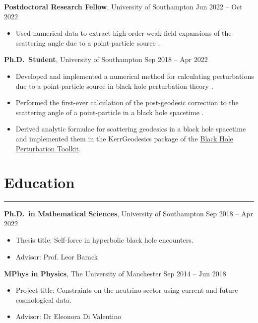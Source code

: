 \documentclass[10.5pt, oneside]{article}   	%
\begin{document}
\textbf{Postdoctoral Research Fellow}, University of Southampton \hfill Jun 2022 -- Oct 2022\\ 
\vspace{-5mm}
\begin{itemize}
\item Used numerical data to extract high-order weak-field expansions of the scattering angle due to a point-particle source \cite{Barack:2023oqp}.
\end{itemize}

\textbf{Ph.D.\ Student}, University of Southampton \hfill Sep 2018 -- Apr 2022\\ 
\vspace{-5mm}
\begin{itemize}
\item Developed and implemented a numerical method for calculating perturbations due to a point-particle source in black hole perturbation theory \cite{Barack:2022pde,Long:2021ufh}.
\item Performed the first-ever calculation of the post-geodesic correction to the scattering angle of a point-particle in a black hole spacetime \cite{Barack:2022pde}.
\item Derived analytic formulae for scattering geodesics in a black hole spacetime \cite{Long:2021ufh} and implemented them in the KerrGeodesics package of the \href{https://bhptoolkit.org/}{Black Hole Perturbation Toolkit}.
\end{itemize}


{\color{Sectioncolour}
\section*{Education}
\vspace{-3mm}
\noindent\rule{\linewidth}{0.6pt}}

\textbf{Ph.D.\ in Mathematical Sciences}, University of Southampton \hfill Sep 2018 -- Apr 2022 \\
\vspace{-5mm} 
\begin{itemize}
\item Thesis title: Self-force in hyperbolic black hole encounters.
\item Advisor: Prof. Leor Barack
\end{itemize}
\textbf{MPhys in Physics}, The University of Manchester \hfill Sep 2014 -- Jun 2018 \\ 
\vspace{-5mm}
\begin{itemize}
\item Project title: Constraints on the neutrino sector using current and future cosmological data.
\item Advisor: Dr Eleonora Di Valentino
\end{itemize}
\end{document}
